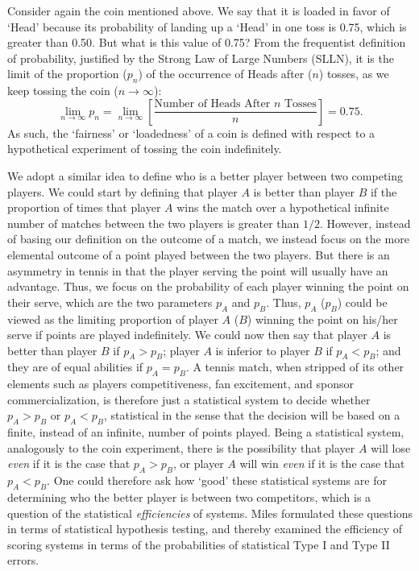 \documentclass[11pt]{article}
\theoremstyle{plain}
\theoremstyle{definition}
\begin{document}
Consider again the coin mentioned above. We say that it is loaded in favor of `Head' because its probability of landing up a `Head' in one toss is 0.75, which is greater than 0.50. But what is this value of 0.75? From the frequentist definition of probability, justified by the Strong Law of Large Numbers (SLLN), it is the limit of the proportion ($p_n$) of the occurrence of Heads after ($n$) tosses, as we keep tossing the coin ($n \rightarrow \infty$):
%
$$\lim_{n\rightarrow\infty} p_n = \lim_{n\rightarrow\infty}\left[\frac{\mbox{Number of Heads After $n$ Tosses}}{n}\right] = 0.75.$$
%
As such, the `fairness' or `loadedness' of a coin is defined with respect to a hypothetical experiment of tossing the coin indefinitely.

We adopt a similar idea to define who is a better player between two competing players. We could start by defining that player $A$ is better than player $B$ if the proportion of times that player $A$ wins the match over a hypothetical infinite number of matches between the two players is greater than $1/2$. However, instead of basing our definition on the outcome of a match, we instead focus on the more elemental outcome of a point played between the two players. But there is an asymmetry in tennis in that the player serving the point will usually have an advantage. Thus, we focus on the probability of each player winning the point on their serve, which are the two parameters $p_A$ and $p_B$. Thus, $p_A$ ($p_B$) could be viewed as the limiting proportion of player $A$ ($B$) winning the point on his/her serve if points are played indefinitely. We could now then say that player $A$ is better than player $B$ if $p_A > p_B$; player $A$ is inferior to player $B$ if $p_A < p_B$; and they are of equal abilities if $p_A = p_B$. A tennis match, when stripped of its other elements such as players competitiveness, fan excitement, and sponsor commercialization, is therefore just a statistical system to decide whether $p_A > p_B$ or $p_A < p_B$, statistical in the sense that the decision will be based on a finite, instead of an infinite, number of points played. Being a statistical system, analogously to the coin experiment, there is the possibility that player $A$ will lose {\em even} if it is the case that $p_A > p_B$, or player $A$ will win {\em even} if it is the case that $p_A < p_B$.
%
One could therefore ask how `good' these statistical systems are for determining who the better player is between two competitors, which is a question of the statistical {\em efficiencies} of systems. Miles \cite{Miles1984} formulated these questions in terms of statistical hypothesis testing, and thereby examined the efficiency of scoring systems in terms of the probabilities of statistical Type I and Type II errors.  
\end{document}

